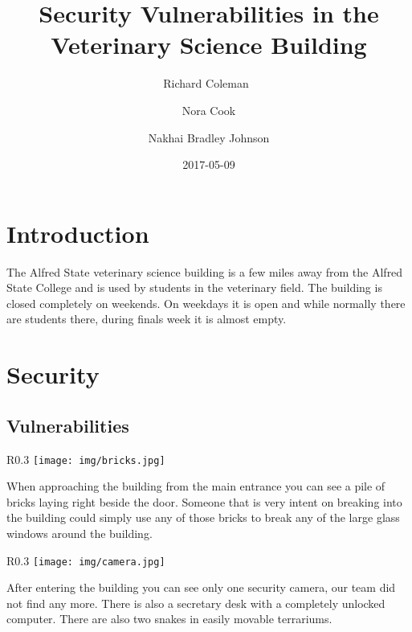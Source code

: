 \documentclass[12pt]{article}
\title{Security Vulnerabilities in the Veterinary Science Building}
\date{2017-05-09}
\author{Richard Coleman\
        \and
        Nora Cook
        \and
        Nakhai Bradley Johnson
        }
\begin{document}
        \maketitle
        \newpage
\section{Introduction}
        The Alfred State veterinary science building is a few miles away from the 
        Alfred State College and is used by students in the veterinary field. The
        building is closed completely on weekends. On weekdays it is open and while
        normally there are students there, during finals week it is almost empty.

\section{Security}
        \subsection{Vulnerabilities}
        
        \begin{wrapfigure}{R}{0.3\textwidth}
        \centering
        \texttt{[image: img/bricks.jpg]}
        \end{wrapfigure}

        When approaching the building from the main entrance you can see a pile of 
        bricks laying right beside the door. Someone that is very intent on breaking
        into the building could simply use any of those bricks to break any of the 
        large glass windows around the building.
        
        \begin{wrapfigure}{R}{0.3\textwidth}
        \centering
        \texttt{[image: img/camera.jpg]}
        \end{wrapfigure}

        After entering the building you can see only one security camera, our team
        did not find any more. There is also a secretary desk with a completely 
        unlocked computer. There are also two snakes in easily movable terrariums.
\end{document}
